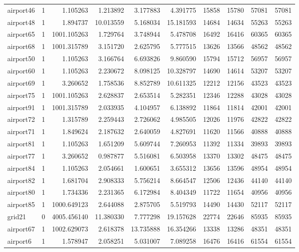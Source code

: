 \begin{longtable}{|l|r|r|r|r|r|r|r|r|r|}
airport46 & 1 & 1.105263 & 1.213892 & 3.177883 & 4.391775 & 15858 & 15780 & 57081 & 57081 \\
airport48 & 1 & 1.894737 & 10.013559 & 5.168034 & 15.181593 & 14684 & 14634 & 55263 & 55263 \\
airport65 & 1 & 1001.105263 & 1.729764 & 3.748944 & 5.478708 & 16492 & 16416 & 60365 & 60365 \\
airport68 & 1 & 1001.315789 & 3.151720 & 2.625795 & 5.777515 & 13626 & 13566 & 48562 & 48562 \\
airport50 & 1 & 1.105263 & 3.166764 & 6.693826 & 9.860590 & 15794 & 15712 & 56957 & 56957 \\
airport60 & 1 & 1.105263 & 2.230672 & 8.098125 & 10.328797 & 14690 & 14614 & 53207 & 53207 \\
airport69 & 1 & 3.260652 & 1.758536 & 8.852789 & 10.611325 & 12212 & 12156 & 43523 & 43523 \\
airport75 & 1 & 1001.105263 & 2.628837 & 2.653514 & 5.282351 & 12346 & 12288 & 43028 & 43028 \\
airport91 & 1 & 1001.315789 & 2.033935 & 4.104957 & 6.138892 & 11864 & 11814 & 42001 & 42001 \\
airport72 & 1 & 1.315789 & 2.259443 & 2.726062 & 4.985505 & 12026 & 11976 & 42822 & 42822 \\
airport71 & 1 & 1.849624 & 2.187632 & 2.640059 & 4.827691 & 11620 & 11566 & 40888 & 40888 \\
airport81 & 1 & 1.105263 & 1.651209 & 5.609744 & 7.260953 & 11392 & 11334 & 39893 & 39893 \\
airport77 & 1 & 3.260652 & 0.987877 & 5.516081 & 6.503958 & 13370 & 13302 & 48475 & 48475 \\
airport84 & 1 & 1.105263 & 2.054661 & 1.600651 & 3.655312 & 13656 & 13596 & 48954 & 48954 \\
airport82 & 1 & 1.681704 & 2.908333 & 5.756214 & 8.664547 & 12506 & 12436 & 44140 & 44140 \\
airport80 & 1 & 1.734336 & 2.231365 & 6.172984 & 8.404349 & 11722 & 11654 & 40956 & 40956 \\
airport85 & 1 & 1000.649123 & 2.644088 & 2.875705 & 5.519793 & 14490 & 14430 & 52117 & 52117 \\
grid21 & 0 & 4005.456140 & 11.380330 & 7.777298 & 19.157628 & 22774 & 22646 & 85935 & 85935 \\
airport67 & 1 & 1002.629073 & 2.618378 & 13.735888 & 16.354266 & 13338 & 13286 & 48351 & 48351 \\
airport6 & 1 & 1.578947 & 2.058251 & 5.031007 & 7.089258 & 16476 & 16416 & 61554 & 61554 \\

\end{longtable}
